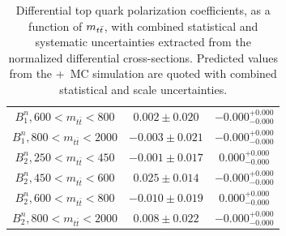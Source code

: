 \begin{table}[htb]
\begin{tabular}{c | c c}
$B_{1}^{n}, {600 < m_{t\bar{t}} < 800}$ & $0.002 \pm 0.020$ & $-0.000^{+0.000}_{-0.000}$ \\
$B_{1}^{n}, {800 < m_{t\bar{t}} < 2000}$ & $-0.003 \pm 0.021$ & $-0.000^{+0.000}_{-0.000}$ \\
$B_{2}^{n}, {250 < m_{t\bar{t}} < 450}$ & $-0.001 \pm 0.017$ & $0.000^{+0.000}_{-0.000}$ \\
$B_{2}^{n}, {450 < m_{t\bar{t}} < 600}$ & $0.025 \pm 0.014$ & $-0.000^{+0.000}_{-0.000}$ \\
$B_{2}^{n}, {600 < m_{t\bar{t}} < 800}$ & $-0.010 \pm 0.019$ & $0.000^{+0.000}_{-0.000}$ \\
$B_{2}^{n}, {800 < m_{t\bar{t}} < 2000}$ & $0.008 \pm 0.022$ & $-0.000^{+0.000}_{-0.000}$ \\
\hline
\end{tabular}
    \caption{
    Differential top quark polarization coefficients, as a function of $m_{t\bar{t}}$, with combined statistical and systematic uncertainties extracted from the normalized differential cross-sections. 
    Predicted values from the \Powheg+\Pythia\ MC simulation are quoted with combined statistical and scale uncertainties.
    }
    \label{tab:Extracted_Coefficients_2D_Polarizations}
\end{table}

